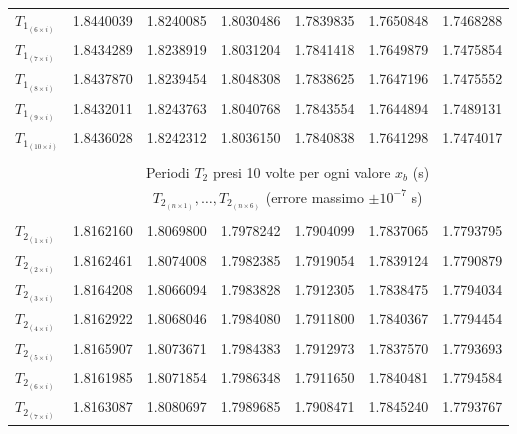 \begin{table*}[t!]
\begin{tabular}{l*{6}{c}}
        $T_{1_{(6 \times i)}}$ & 1.8440039 & 1.8240085          & 1.8030486          & 1.7839835 & 1.7650848 & 1.7468288                  \\[+0.5ex]
        $T_{1_{(7 \times i)}}$ & 1.8434289 & 1.8238919          & 1.8031204          & 1.7841418 & 1.7649879 & 1.7475854                  \\[+0.5ex]
        $T_{1_{(8 \times i)}}$ & 1.8437870 & 1.8239454          & 1.8048308          & 1.7838625 & 1.7647196 & 1.7475552                  \\[+0.5ex]
        $T_{1_{(9 \times i)}}$ & 1.8432011 & 1.8243763          & 1.8040768          & 1.7843554 & 1.7644894 & 1.7489131                  \\[+0.5ex]
        $T_{1_{(10\times i)}}$ & 1.8436028 & 1.8242312          & 1.8036150          & 1.7840838 & 1.7641298 & 1.7474017                  \\[+0.5ex] \hline \\[-1.5ex]
                               & \multicolumn{6}{c}{Periodi $T_2$ presi 10 volte per ogni valore $x_b$ (s)}                               \\[+0.5ex]
                               & \multicolumn{6}{c}{$T_{2_{(n \times 1)}}, \ldots, T_{2_{(n \times 6)}}$ (errore massimo $\pm10^{-7}$ s)} \\[+0.5ex] \hline \\[-1.5ex]
        $T_{2_{(1 \times i)}}$ & 1.8162160 & 1.8069800          & 1.7978242          & 1.7904099 & 1.7837065 & 1.7793795                  \\[+0.5ex]
        $T_{2_{(2 \times i)}}$ & 1.8162461 & 1.8074008          & 1.7982385          & 1.7919054 & 1.7839124 & 1.7790879                  \\[+0.5ex]
        $T_{2_{(3 \times i)}}$ & 1.8164208 & 1.8066094          & 1.7983828          & 1.7912305 & 1.7838475 & 1.7794034                  \\[+0.5ex]
        $T_{2_{(4 \times i)}}$ & 1.8162922 & 1.8068046          & 1.7984080          & 1.7911800 & 1.7840367 & 1.7794454                  \\[+0.5ex]
        $T_{2_{(5 \times i)}}$ & 1.8165907 & 1.8073671          & 1.7984383          & 1.7912973 & 1.7837570 & 1.7793693                  \\[+0.5ex]
        $T_{2_{(6 \times i)}}$ & 1.8161985 & 1.8071854          & 1.7986348          & 1.7911650 & 1.7840481 & 1.7794584                  \\[+0.5ex]
        $T_{2_{(7 \times i)}}$ & 1.8163087 & 1.8080697          & 1.7989685          & 1.7908471 & 1.7845240 & 1.7793767                  \\[+0.5ex]

\end{tabular}
\end{table*}
